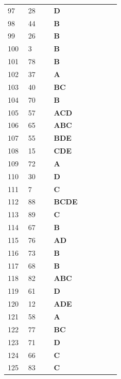 \documentclass[UTF8,fontset=windows,11pt]{ctexart}
\begin{document}
\begin{longtable}{p{0.16\linewidth}p{0.2\linewidth}p{0.52\linewidth}}
97 & 28 & \textbf{\textcolor{answergreen}{D}} \\
98 & 44 & \textbf{\textcolor{answergreen}{B}} \\
99 & 26 & \textbf{\textcolor{answergreen}{B}} \\
100 & 3 & \textbf{\textcolor{answergreen}{B}} \\
101 & 78 & \textbf{\textcolor{answergreen}{B}} \\
102 & 37 & \textbf{\textcolor{answergreen}{A}} \\
103 & 40 & \textbf{\textcolor{answergreen}{BC}} \\
104 & 70 & \textbf{\textcolor{answergreen}{B}} \\
105 & 57 & \textbf{\textcolor{answergreen}{ACD}} \\
106 & 65 & \textbf{\textcolor{answergreen}{ABC}} \\
107 & 55 & \textbf{\textcolor{answergreen}{BDE}} \\
108 & 15 & \textbf{\textcolor{answergreen}{CDE}} \\
109 & 72 & \textbf{\textcolor{answergreen}{A}} \\
110 & 30 & \textbf{\textcolor{answergreen}{D}} \\
111 & 7 & \textbf{\textcolor{answergreen}{C}} \\
112 & 88 & \textbf{\textcolor{answergreen}{BCDE}} \\
113 & 89 & \textbf{\textcolor{answergreen}{C}} \\
114 & 67 & \textbf{\textcolor{answergreen}{B}} \\
115 & 76 & \textbf{\textcolor{answergreen}{AD}} \\
116 & 73 & \textbf{\textcolor{answergreen}{B}} \\
117 & 68 & \textbf{\textcolor{answergreen}{B}} \\
118 & 82 & \textbf{\textcolor{answergreen}{ABC}} \\
119 & 61 & \textbf{\textcolor{answergreen}{D}} \\
120 & 12 & \textbf{\textcolor{answergreen}{ADE}} \\
121 & 58 & \textbf{\textcolor{answergreen}{A}} \\
122 & 77 & \textbf{\textcolor{answergreen}{BC}} \\
123 & 71 & \textbf{\textcolor{answergreen}{D}} \\
124 & 66 & \textbf{\textcolor{answergreen}{C}} \\
125 & 83 & \textbf{\textcolor{answergreen}{C}} \\

\end{longtable}
\end{document}
